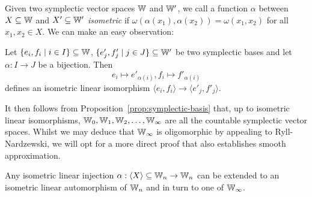 Given two symplectic vector spaces $\mathbb{W}$ and $\mathbb{W}'$,
we call a function $\alpha$ between $X \subseteq \mathbb{W}$ and $X' \subseteq \mathbb{W}'$ \emph{isometric} if 
$\omega(\alpha(x_1), \alpha(x_2)) = \omega(x_1, x_2)$ for all $x_1, x_2 \in X$.
We can make an easy observation:
\begin{lemma}\label{lem:symplectic-basis-gives-isometry}
Let $\{e_i, f_i \mid i \in I\} \subseteq \mathbb{W}$, $\{e'_j, f'_j \mid j \in J\} \subseteq \mathbb{W}'$ be two symplectic bases
and let $\alpha : I \to J$ be a bijection.
Then 
\[
    e_i \mapsto e'_{\alpha(i)}, f_i \mapsto f'_{\alpha(i)}
\]
defines an isometric linear isomorphism $\langle e_i, f_i \rangle \to \langle e'_j, f'_j \rangle$.
\end{lemma}

It then follows from Proposition~\ref{prop:symplectic-basis} that, 
up to isometric linear isomorphisms, 
$\mathbb{W}_0, \mathbb{W}_1, \mathbb{W}_2, \ldots, \mathbb{W}_\infty$ are all the countable symplectic vector spaces.
Whilst we may deduce that $\mathbb{W}_\infty$ is oligomorphic by appealing to Ryll-Nardzewski,
we will opt for a more direct proof that also establishes smooth approximation.

\begin{proposition} \label{prop:symplectic-witt-extension}
    Any isometric linear injection $\alpha : \langle X \rangle \subseteq \mathbb{W}_n \to \mathbb{W}_n$ 
    can be extended to an isometric linear automorphism of $\mathbb{W}_n$
    and in turn to one of $\mathbb{W}_\infty$.
\end{proposition}

